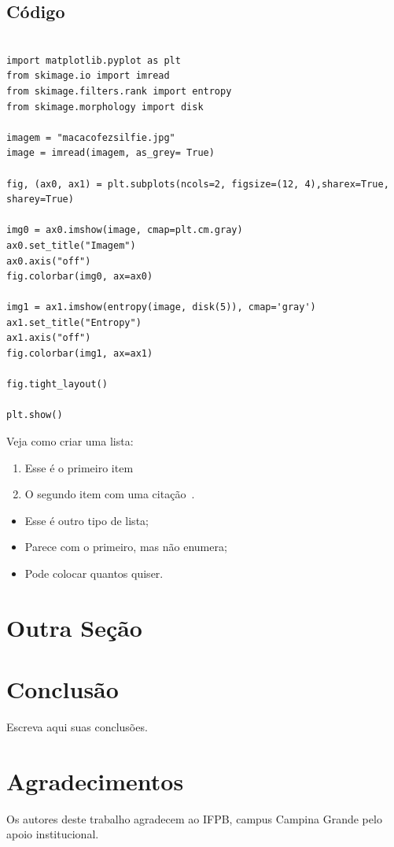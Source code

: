 \documentclass[journal]{IEEEtran}
\begin{document}
\subsection{Código}

 \begin{lstlisting}

import matplotlib.pyplot as plt
from skimage.io import imread
from skimage.filters.rank import entropy
from skimage.morphology import disk

imagem = "macacofezsilfie.jpg" 
image = imread(imagem, as_grey= True) 

fig, (ax0, ax1) = plt.subplots(ncols=2, figsize=(12, 4),sharex=True, sharey=True)

img0 = ax0.imshow(image, cmap=plt.cm.gray)
ax0.set_title("Imagem")
ax0.axis("off")
fig.colorbar(img0, ax=ax0)

img1 = ax1.imshow(entropy(image, disk(5)), cmap='gray')
ax1.set_title("Entropy")
ax1.axis("off")
fig.colorbar(img1, ax=ax1)

fig.tight_layout()

plt.show()

\end{lstlisting}
Veja como criar uma lista:
\begin{enumerate}
    \item Esse é o primeiro item
    \item O segundo item com uma citação~\cite{akyildiz2006next}.
\end{enumerate}


\begin{itemize}
    \item Esse é outro tipo de lista;
    \item Parece com o primeiro, mas não enumera;
    \item Pode colocar quantos quiser.
\end{itemize}


\section{Outra Seção}




\section{Conclusão}
Escreva aqui suas conclusões. \lipsum[1-2]

\section*{Agradecimentos}

Os autores deste trabalho agradecem ao IFPB, campus Campina Grande pelo apoio institucional. 



\end{document}
